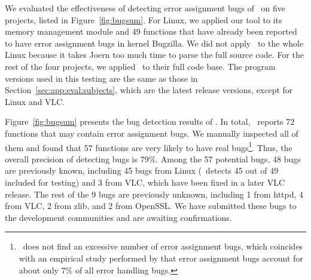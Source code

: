 \documentclass[12pt]{report}	%
\begin{document}
We evaluated the effectiveness of detecting error assignment bugs 
of \bugTool\ on five projects,
listed in Figure~\ref{fig:bugsum}. 
%
For Linux, 
we applied our tool to its memory management module and
49 functions that have already been reported 
to have error assignment bugs in kernel Bugzilla. 
%
We did not apply \bugTool\ to the whole Linux because
it takes Joern too much time to parse the full source
code.
%
For the rest of the four projects, we applied \bugTool\ to
their full code base. 
%
The program versions used in this testing are the same as
those in Section~\ref{sec:app:eval:subjects}, which are the 
latest release versions, except for Linux and VLC.

Figure~\ref{fig:bugsum} presents the bug detection results of \bugTool.
In total, \bugTool\ reports
72 functions that may contain
error assignment bugs.
We manually inspected all of them and found that 57 functions are
very likely to have real bugs\footnote{\bugTool\ does not find an excessive number of error assignment 
bugs, which coincides with an empirical study performed by 
\cite{Tian:2017:ADR}
that error assignment
bugs account for about only 7\% of all error handling bugs.
}. 
Thus, the overall precision of detecting bugs is 79\%.
%
Among the 57 potential bugs, 48 bugs are previously known, including
45 bugs from Linux (\newTool\ detects 45 out of 49 included for testing) 
and 3 from VLC, which have been fixed in a later VLC release. 
The rest of the 9 bugs are previously unknown,
including 1 from httpd, 4 from VLC, 2 from zlib, and
2 from OpenSSL.
%
We have submitted these bugs to the development communities
and are awaiting confirmations.
\end{document}
